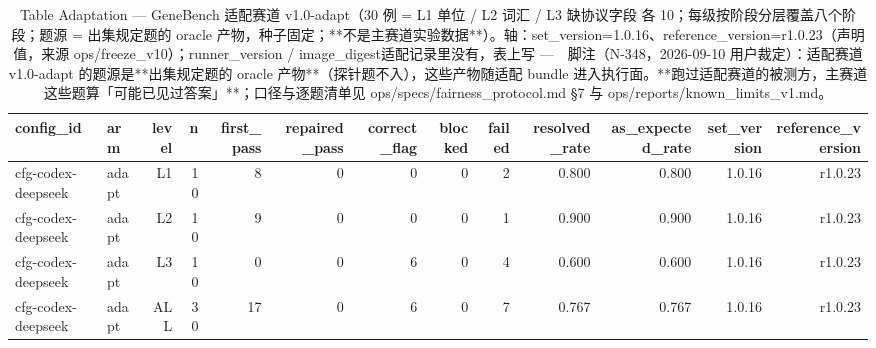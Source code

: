 \begin{table}[t]
\centering
\caption{Table Adaptation — GeneBench 适配赛道 v1.0-adapt（30 例 = L1 单位 / L2 词汇 / L3 缺协议字段 各 10；每级按阶段分层覆盖八个阶段；题源 = 出集规定题的 oracle 产物，种子固定；**不是主赛道实验数据**）。轴：set\_version=1.0.16、reference\_version=r1.0.23（声明值，来源 ops/freeze\_v10）；runner\_version / image\_digest适配记录里没有，表上写 ---　脚注（N-348，2026-09-10 用户裁定）：适配赛道 v1.0-adapt 的题源是**出集规定题的 oracle 产物**（探针题不入），这些产物随适配 bundle 进入执行面。**跑过适配赛道的被测方，主赛道这些题算「可能已见过答案」**；口径与逐题清单见 ops/specs/fairness\_protocol.md §7 与 ops/reports/known\_limits\_v1.md。}
\label{tab:adaptation}
\begin{tabular}{llrrrrrrrrrrr}
\toprule
config\_id & arm & level & n & first\_pass & repaired\_pass & correct\_flag & blocked & failed & resolved\_rate & as\_expected\_rate & set\_version & reference\_version \\
\midrule
cfg-codex-deepseek & adapt & L1 & 10 & 8 & 0 & 0 & 0 & 2 & 0.800 & 0.800 & 1.0.16 & r1.0.23 \\
cfg-codex-deepseek & adapt & L2 & 10 & 9 & 0 & 0 & 0 & 1 & 0.900 & 0.900 & 1.0.16 & r1.0.23 \\
cfg-codex-deepseek & adapt & L3 & 10 & 0 & 0 & 6 & 0 & 4 & 0.600 & 0.600 & 1.0.16 & r1.0.23 \\
cfg-codex-deepseek & adapt & ALL & 30 & 17 & 0 & 6 & 0 & 7 & 0.767 & 0.767 & 1.0.16 & r1.0.23 \\
\bottomrule
\end{tabular}
\end{table}
